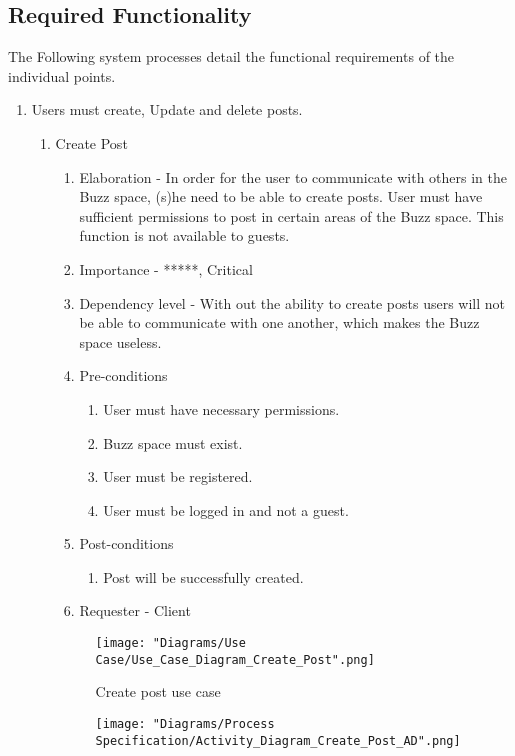\documentclass[12pt]{article}
\begin{document}
\subsection{Required Functionality}
The Following system processes detail the functional requirements of the individual points.
\begin{enumerate}
  \item Users must create, Update and delete posts. %
  	\begin{enumerate}
  		\item Create Post
  		\begin{enumerate}
    		\item Elaboration - In order for the user to communicate with others in the Buzz space, (s)he need to be able to 				create posts. User must have sufficient permissions to post in certain areas of the Buzz space. This function is not available to guests.
   	 		\item Importance - *****, Critical
   	 		\item Dependency level - With out the ability to create posts users will not be able to communicate with one another, which makes the Buzz space useless.
   	 		\item Pre-conditions
   			\begin{enumerate}
    			\item User must have necessary permissions.
    			\item Buzz space must exist.
    			\item User must be registered.
    			\item User must be logged in and not a guest.
    		\end{enumerate}
     		\item Post-conditions
    		\begin{enumerate}
  	  			\item Post will be successfully created.
   	 		\end{enumerate}
   	 		\item Requester - Client
  		\end{enumerate}
  	\begin{figure}[h]
  		\centering
  		\texttt{[image: "Diagrams/Use Case/Use\_Case\_Diagram\_Create\_Post".png]}
  		\caption{Create post use case}
  	\end{figure}
  	\begin{figure}[h]
  		\centering
  		\texttt{[image: "Diagrams/Process Specification/Activity\_Diagram\_Create\_Post\_AD".png]}

\end{figure}
\end{enumerate}
\end{enumerate}
\end{document}

